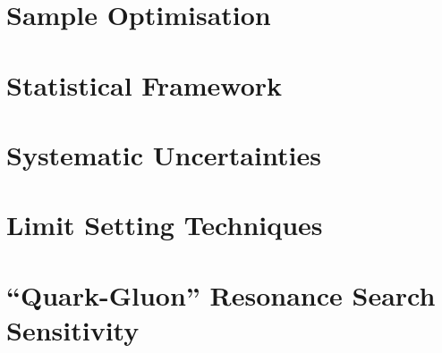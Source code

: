 \documentclass[NOTE, atlasdraft=true, texlive=2020, UKenglish]{atlasdoc}
\begin{document}
\section{Sample Optimisation}

\clearpage



\section{Statistical Framework}



%

%
%
%
\section{Systematic Uncertainties}
%

%
\clearpage
%
%
%
\section{Limit Setting Techniques}

\clearpage


\section{``Quark-Gluon'' Resonance Search Sensitivity}

\end{document}
